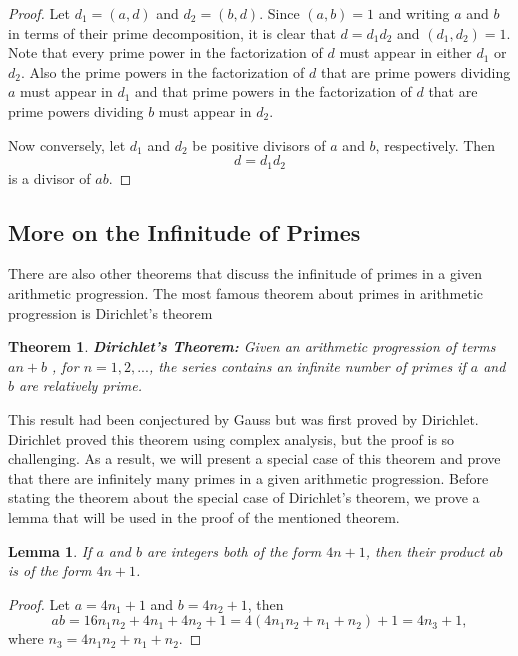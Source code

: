 \documentclass[12pt,letterpaper]{book}
\newtheorem{theorem}{Theorem}
\newtheorem{lemma}{Lemma}
\begin{document}
\begin{proof}
Let $d_1=(a,d)$ and $d_2=(b,d)$.  Since $(a,b)=1$ and writing $a$
and $b$ in terms of their prime decomposition, it is clear that
$d=d_1d_2$ and $(d_1,d_2)=1$. Note that every prime power in the
factorization of $d$ must appear in either $d_1$ or $d_2$. Also the
prime powers in the factorization of $d$ that are prime powers
dividing $a$ must appear in $d_1$ and that prime powers in the
factorization of $d$ that are prime powers dividing $b$ must appear
in $d_2$.
\par Now conversely, let $d_1$ and $d_2$ be positive divisors of
$a$ and $b$, respectively.  Then
\begin{equation*}
d=d_1d_2
\end{equation*}
is a divisor of $ab$.
\end{proof}


\subsection{More on the Infinitude of Primes}

There are also other theorems that discuss the infinitude of primes
in a given arithmetic progression.  The most famous theorem about
primes in arithmetic progression is Dirichlet's theorem
\begin{theorem}
\textbf{Dirichlet's Theorem:} Given an arithmetic progression of
terms $an+b$ , for $n=1, 2, ...$, the series contains an infinite
number of primes if  $a$ and $b$ are relatively prime.
\end{theorem}
This result had been conjectured by Gauss but was first proved by
Dirichlet. Dirichlet proved this theorem using complex analysis, but
the proof is so challenging.  As a result, we will present a special
case of this theorem and prove that there are infinitely many primes
in a given arithmetic progression.  Before stating the theorem about
the special case of Dirichlet's theorem, we prove a lemma that will
be used in the proof of the mentioned theorem.

\begin{lemma}
If $a$ and $b$ are integers both of the form $4n+1$, then their
product $ab$ is of the form $4n+1$.
\end{lemma}

\begin{proof}
Let $a=4n_1+1$ and $b=4n_2+1$, then
\begin{equation*}
ab=16n_1n_2+4n_1+4n_2+1=4(4n_1n_2+n_1+n_2)+1=4n_3+1,
\end{equation*}
where $n_3=4n_1n_2+n_1+n_2$.
\end{proof}
\end{document}
